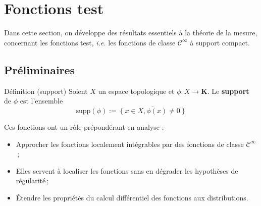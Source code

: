 \newpage

\section{Fonctions test}

        Dans cette section, on développe des résultats essentiels à la théorie de la mesure, concernant les fonctions test, \textit{i.e.} les fonctions de classe $\mathcal{C}^{\infty}$ à support compact.

    \subsection{Préliminaires}

        \begin{omed}{Définition (support)}
            Soient $X$ un espace topologique et $\phi : X \to \mathbf{K}$. Le \textbf{support} de $\phi$ est l’ensemble 
            \[ \text{supp}(\phi) := \overline{\left\{x \in X, \phi(x) \neq 0 \right\}} \]
        \end{omed}

        Ces fonctions ont un rôle prépondérant en analyse :
        \begin{itemize}
            \item Approcher les fonctions localement intégrables par des fonctions de classe $\mathcal{C}^{\infty}$ ;
            \item Elles servent à localiser les fonctions sans en dégrader les hypothèses de régularité ;
            \item Étendre les propriétés du calcul différentiel des fonctions aux distributions.
        \end{itemize}

